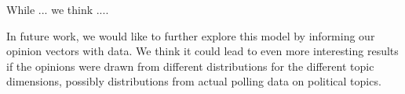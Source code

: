 
While ... we think ....

In future work, we would like to further explore this model by informing our opinion vectors with data.
We think it could lead to even more interesting results if the opinions were drawn from different distributions for the different topic dimensions, possibly distributions from actual polling data on political topics.
